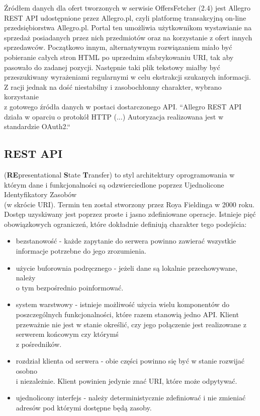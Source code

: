 Źródłem danych dla ofert tworzonych w serwisie OffersFetcher (2.4)
jest Allegro REST API udostępnione przez Allegro.pl, czyli platformę transakcyjną on-line przedsiębiorstwa Allegro.pl. Portal ten umożliwia użytkownikom wystawianie na sprzedaż posiadanych przez nich przedmiotów oraz na korzystanie z ofert innych sprzedawców.  Początkowo innym, alternatywnym rozwiązaniem miało być pobieranie całych stron HTML po uprzednim sfabrykowaniu URI, tak aby pasowało do zadanej pozycji. Następnie taki plik tekstowy miałby być przeszukiwany wyrażeniami regularnymi w celu ekstrakcji szukanych informacji. Z racji jednak na dość niestabilny i zasobochłonny charakter, wybrano korzystanie\\z gotowego źródła danych w postaci dostarczonego API.\newline
``Allegro REST API działa w oparciu o protokół HTTP (...) Autoryzacja realizowana jest w standardzie OAuth2.``~\cite{allegroApi}

\subsection{REST API}
(\textbf{RE}presentational \textbf{S}tate \textbf{T}ransfer) to styl architektury oprogramowania w którym dane i funkcjonalności są odzwierciedlone poprzez Ujednolicone Identyfikatory Zasobów\\(w skrócie URI). Termin ten został stworzony przez Roya Fieldinga w 2000 roku. Dostęp uzyskiwany jest poprzez proste i jasno zdefiniowane operacje.  Istnieje pięć obowiązkowych ograniczeń, które dokładnie definiują charakter tego podejścia:
\begin{itemize}
	\item bezstanowość - każde zapytanie do serwera powinno zawierać wszystkie informacje potrzebne do jego zrozumienia.
	\item użycie buforownia podręcznego - jeżeli dane są lokalnie przechowywane, należy\\o tym bezpośrednio poinformować.
	\item system warstwowy - istnieje możliwość użycia wielu komponentów do poszczególnych funkcjonalności, które razem stanowią jedno API. Klient przeważnie nie jest w stanie określić, czy jego połączenie jest realizowane z serwerem końcowym czy którymś\\z pośredników.
	\item rozdział klienta od serwera - obie części powinno się być w stanie rozwijać osobno\\i niezależnie. Klient powinien jedynie znać URI, które może odpytywać.
	\item ujednolicony interfejs - należy deterministycznie zdefiniować i nie zmieniać adresów pod którymi dostępne będą zasoby. 
\end{itemize}~\cite{fielding}

